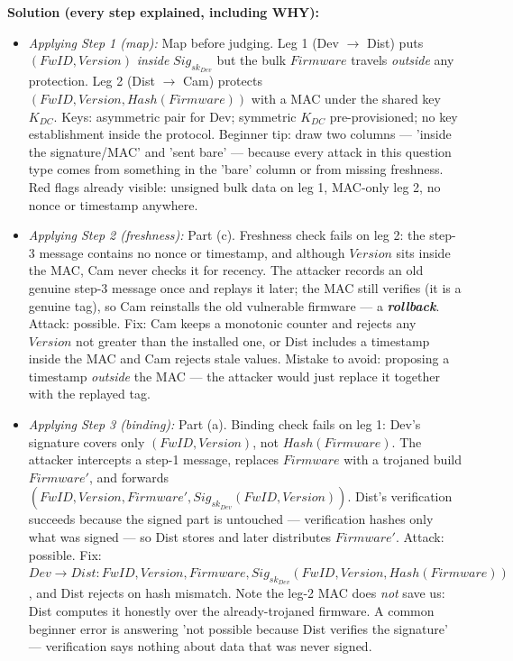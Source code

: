 \documentclass[12pt, a4paper]{article}
\newcommand{\term}[1]{\textbf{\textit{#1}}}        %
\begin{document}
\textbf{Solution (every step explained, including WHY):}
\begin{itemize}
    \item \textit{Applying Step 1 (map):} Map before judging. Leg 1 (Dev $\to$ Dist) puts $(FwID, Version)$ \emph{inside} $Sig_{sk_{Dev}}$ but the bulk $Firmware$ travels \emph{outside} any protection. Leg 2 (Dist $\to$ Cam) protects $(FwID, Version, Hash(Firmware))$ with a MAC under the shared key $K_{DC}$. Keys: asymmetric pair for Dev; symmetric $K_{DC}$ pre-provisioned; no key establishment inside the protocol. Beginner tip: draw two columns --- 'inside the signature/MAC' and 'sent bare' --- because every attack in this question type comes from something in the 'bare' column or from missing freshness. Red flags already visible: unsigned bulk data on leg 1, MAC-only leg 2, no nonce or timestamp anywhere.
    \item \textit{Applying Step 2 (freshness):} Part (c). Freshness check fails on leg 2: the step-3 message contains no nonce or timestamp, and although $Version$ sits inside the MAC, Cam never checks it for recency. The attacker records an old genuine step-3 message once and replays it later; the MAC still verifies (it is a genuine tag), so Cam reinstalls the old vulnerable firmware --- a \term{rollback}. Attack: possible. Fix: Cam keeps a monotonic counter and rejects any $Version$ not greater than the installed one, or Dist includes a timestamp inside the MAC and Cam rejects stale values. Mistake to avoid: proposing a timestamp \emph{outside} the MAC --- the attacker would just replace it together with the replayed tag.
    \item \textit{Applying Step 3 (binding):} Part (a). Binding check fails on leg 1: Dev's signature covers only $(FwID, Version)$, not $Hash(Firmware)$. The attacker intercepts a step-1 message, replaces $Firmware$ with a trojaned build $Firmware'$, and forwards $(FwID, Version, Firmware', Sig_{sk_{Dev}}(FwID, Version))$. Dist's verification succeeds because the signed part is untouched --- verification hashes only what was signed --- so Dist stores and later distributes $Firmware'$. Attack: possible. Fix: $Dev \to Dist : FwID, Version, Firmware, Sig_{sk_{Dev}}(FwID, Version, Hash(Firmware))$, and Dist rejects on hash mismatch. Note the leg-2 MAC does \emph{not} save us: Dist computes it honestly over the already-trojaned firmware. A common beginner error is answering 'not possible because Dist verifies the signature' --- verification says nothing about data that was never signed.

\end{itemize}
\end{document}
